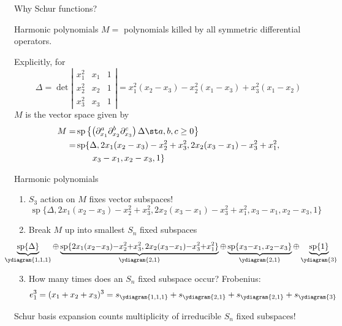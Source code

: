 \documentclass{beamer}
\renewcommand{\Span}{\operatorname{sp}}
\newcounter{c}
\begin{document}
\begin{frame}{Why Schur functions?}
  \begin{block}{Harmonic polynomials}
   \(M =\) polynomials killed by all symmetric differential
   operators.
  \end{block}\pause
  Explicitly, for
   \[
     \Delta = \det \left|
       \begin{matrix}
         x_1^2 & x_1 & 1\\
         x_2^2 & x_2 & 1\\
         x_3^2 & x_3 & 1
       \end{matrix}
     \right| = x_1^2(x_2-x_3) - x_2^2 (x_1 - x_3) + x_3^2(x_1-x_2)
   \]\pause
   \(M\) is the vector space given by\pause
   \begin{align*}
       M  = & \Span\left\{
\left(           \partial_{x_1}^a
           \partial_{x_2}^b  \partial_{x_3}^c
\right)         \Delta \st a,b,c \geq 0\right\} \\
        = & \Span\{\Delta, 2x_1(x_2-x_3)-x_2^2+x_3^2,
            2x_2(x_3-x_1)-x_3^2+x_1^2, \\
       & \phantom{\Span\{\}}x_3-x_1, x_2-x_3,1\}
   \end{align*}
\end{frame}
\begin{frame}{Harmonic polynomials}
  \begin{enumerate}
  \item \(S_3\) action on \(M\) fixes vector subspaces!
  \[
\Span\{\Delta, 2x_1(x_2-x_3)-x_2^2+x_3^2,
            2x_2(x_3-x_1)-x_3^2+x_1^2, 
       x_3-x_1, x_2-x_3,1\}
  \]\pause 
\item Break \(M\) up into smallest \(S_n\) fixed subspaces \pause
  \[
    \hspace{-2.9em}
    \scalebox{0.95}{\(
      \underbrace{\Span\{\Delta\}}_{\ydiagram{1,1,1}} {\oplus} \underbrace{\Span\{2x_1(x_2{-}x_3){-}x_2^2{+}x_3^2,
        2x_2(x_3{-}x_1){-}x_3^2{+}x_1^2\}}_{\ydiagram{2,1}} {\oplus}
      \underbrace{\Span\{x_3{-}x_1, x_2{-}x_3\}}_{\ydiagram{2,1}} {\oplus} \underbrace{\Span\{1\}}_{\ydiagram{3}}\)}
  \]\pause
  \item How many times does an \(S_n\) fixed subspace occur? \pause
    Frobenius: \pause
    \[
      e_1^3 = (x_1+x_2+x_3)^3 = s_{\ydiagram{1,1,1}} + s_{\ydiagram{2,1}} +
      s_{\ydiagram{2,1}} + s_{\ydiagram{3}}
    \]
  \end{enumerate}
  \pause
  Schur basis expansion counts multiplicity of irreducible \(S_n\)
  fixed subspaces!
\end{frame}
\end{document}
